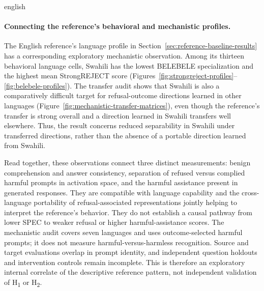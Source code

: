 \begin{otherlanguage*}{english}
\paragraph*{Connecting the reference's behavioral and mechanistic profiles.} The English reference's language profile in Section~\ref{sec:reference-baseline-results} has a corresponding exploratory mechanistic observation. Among its thirteen behavioral language cells, Swahili has the lowest BELEBELE specialization and the highest mean StrongREJECT score (Figures~\ref{fig:strongreject-profiles}--\ref{fig:belebele-profiles}). The transfer audit shows that Swahili is also a comparatively difficult target for refusal-outcome directions learned in other languages (Figure~\ref{fig:mechanistic-transfer-matrices}), even though the reference's transfer is strong overall and a direction learned in Swahili transfers well elsewhere. Thus, the result concerns reduced separability in Swahili under transferred directions, rather than the absence of a portable direction learned from Swahili.

Read together, these observations connect three distinct measurements: benign comprehension and answer consistency, separation of refused versus complied harmful prompts in activation space, and the harmful assistance present in generated responses. They are compatible with language capability and the cross-language portability of refusal-associated representations jointly helping to interpret the reference's behavior. They do not establish a causal pathway from lower SPEC to weaker refusal or higher harmful-assistance scores. The mechanistic audit covers seven languages and uses outcome-selected harmful prompts; it does not measure harmful-versus-harmless recognition. Source and target evaluations overlap in prompt identity, and independent question holdouts and intervention controls remain incomplete. This is therefore an exploratory internal correlate of the descriptive reference pattern, not independent validation of H\textsubscript{1} or H\textsubscript{2}.



\end{otherlanguage*}
